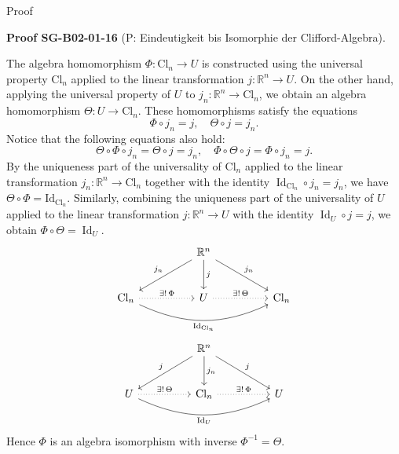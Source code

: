 \documentclass[10pt, letterpaper]{article}
\newcommand{\CustomHeading}[3]{%
  \par\medskip\noindent%
  \textbf{#1 #2} \textnormal{(#3)}.\enskip%
}
\newenvironment{PROOF}[2]{\begin{unitbox}\CustomHeading{Proof}{#1}{#2}}{\end{unitbox}}
\begin{document}
Proof

\begin{PROOF}{SG-B02-01-16}{P: Eindeutigkeit bis Isomorphie der Clifford-Algebra}
The algebra homomorphism $\Phi: \mathrm{Cl}_{n} \longrightarrow U$ is constructed using the universal property $\mathrm{Cl}_{n}$ applied to the linear transformation $j: \mathbb{R}^{n} \longrightarrow U$. On the other hand, applying the universal property of $U$ to $j_{n}: \mathbb{R}^{n} \longrightarrow \mathrm{Cl}_{n}$, we obtain an algebra homomorphism $\Theta: U \longrightarrow \mathrm{Cl}_{n}$. These homomorphisms satisfy the equations
$$
\Phi \circ j_{n}=j, \quad \Theta \circ j=j_{n} .
$$
Notice that the following equations also hold:
$$
\Theta \circ \Phi \circ j_{n}=\Theta \circ j=j_{n}, \quad \Phi \circ \Theta \circ j=\Phi \circ j_{n}=j .
$$
By the uniqueness part of the universality of $\mathrm{Cl}_{n}$ applied to the linear transformation $j_{n}: \mathbb{R}^{n} \longrightarrow \mathrm{Cl}_{n}$ together with the identity $\operatorname{Id}_{\mathrm{Cl}_{n}} \circ j_{n}=j_{n}$, we have $\Theta \circ \Phi=\mathrm{Id}_{\mathrm{Cl}_{n}}$. Similarly, combining the uniqueness part of the universality of $U$ applied to the linear transformation $j: \mathbb{R}^{n} \longrightarrow U$ with the identity $\operatorname{Id}_{U} \circ j=j$, we obtain $\Phi \circ \Theta=\operatorname{Id}_{U}$.
\[
\begin{tikzcd}[row sep=large, column sep=huge]
{} & \mathbb{R}^n & {} \\%
\mathrm{Cl}_n & U & \mathrm{Cl}_n %
\arrow[from=1-2, to=2-1, "j_n"']           %
\arrow[from=1-2, to=2-2, "j"]              %
\arrow[from=1-2, to=2-3, "j_n"]            %
\arrow[from=2-1, to=2-2, dotted, "{\exists!\,\Phi}"]   %
\arrow[from=2-2, to=2-3, dotted, "{\exists!\,\Theta}"] %
\arrow[from=2-1, to=2-3, bend right=25, "\mathrm{Id}_{\mathrm{Cl}_n}"'] %
\end{tikzcd}
\]
\[
\begin{tikzcd}[row sep=large, column sep=huge]
{} & \mathbb{R}^n & {} \\%
U  & \mathrm{Cl}_n & U %
\arrow[from=1-2, to=2-1, "j"']            %
\arrow[from=1-2, to=2-2, "j_n"]           %
\arrow[from=1-2, to=2-3, "j"]             %
\arrow[from=2-1, to=2-2, dotted, "{\exists!\,\Theta}"] %
\arrow[from=2-2, to=2-3, dotted, "{\exists!\,\Phi}"]   %
\arrow[from=2-1, to=2-3, bend right=25, "\mathrm{Id}_U"'] %
\end{tikzcd}
\]
Hence $\Phi$ is an algebra isomorphism with inverse $\Phi^{-1}=\Theta$.
\end{PROOF}
\end{document}
